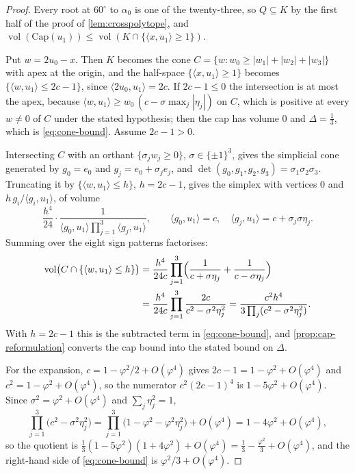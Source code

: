 \documentclass[11pt,reqno]{amsart}
\renewcommand{\_}{\origunderscore\allowbreak}
\numberwithin{equation}{section}
\theoremstyle{plain}
\theoremstyle{definition}
\theoremstyle{remark}
\newcommand{\tilt}{\varphi}                  %
\newcommand{\dev}{\eta}                      %
\newcommand{\defect}{\Delta}                 %
\newcommand{\base}{u}                        %
\newcommand{\capQ}{\mathrm{Cap}}             %
\DeclareMathOperator{\vol}{vol}
\begin{document}
\begin{proof}
Every root at $60^\circ$ to $\alpha_0$ is one of the twenty-three, so
$Q\subseteq K$ by the first half of the proof of
\cref{lem:crosspolytope}, and $\vol(\capQ(\base_1))\le\vol(K\cap\{\langle
x,\base_1\rangle\ge1\})$.

Put $w=2\base_0-x$. Then $K$ becomes the cone
$C=\{w:w_0\ge|w_1|+|w_2|+|w_3|\}$ with apex at the origin, and the
half-space $\{\langle x,\base_1\rangle\ge1\}$ becomes $\{\langle
w,\base_1\rangle\le2c-1\}$, since $\langle
2\base_0,\base_1\rangle=2c$. If $2c-1\le0$ the intersection is at most
the apex, because $\langle w,\base_1\rangle\ge w_0\,(c-\sigma\max_j|\dev_j|)$
on $C$, which is positive at every $w\ne0$ of $C$ under the stated
hypothesis; then the cap has volume $0$ and $\defect=\tfrac13$, which is
\eqref{eq:cone-bound}. Assume $2c-1>0$.

Intersecting $C$ with an orthant $\{\sigma_jw_j\ge0\}$, $\sigma\in\{\pm
1\}^3$, gives the simplicial cone generated by $g_0=e_0$ and
$g_j=e_0+\sigma_je_j$, and $\det(g_0,g_1,g_2,g_3)=\sigma_1\sigma_2\sigma_3$.
Truncating it by $\{\langle w,\base_1\rangle\le h\}$, $h=2c-1$, gives the
simplex with vertices $0$ and $h\,g_i/\langle g_i,\base_1\rangle$, of
volume
\[
  \frac{h^4}{24}\cdot\frac{1}{\langle g_0,\base_1\rangle
  \prod_{j=1}^{3}\langle g_j,\base_1\rangle},
  \qquad
  \langle g_0,\base_1\rangle=c,\quad
  \langle g_j,\base_1\rangle=c+\sigma_j\sigma\dev_j .
\]
Summing over the eight sign patterns factorises:
\[
\begin{aligned}
  \vol\bigl(C\cap\{\langle w,\base_1\rangle\le h\}\bigr)
  &=\frac{h^4}{24c}\prod_{j=1}^{3}
   \Bigl(\frac{1}{c+\sigma\dev_j}+\frac{1}{c-\sigma\dev_j}\Bigr)\\
  &=\frac{h^4}{24c}\prod_{j=1}^{3}\frac{2c}{c^2-\sigma^2\dev_j^2}
  =\frac{c^2h^4}{3\prod_j(c^2-\sigma^2\dev_j^2)} .
\end{aligned}
\]
With $h=2c-1$ this is the subtracted term in \eqref{eq:cone-bound}, and
\cref{prop:cap-reformulation} converts the cap bound into the stated
bound on $\defect$.

For the expansion, $c=1-\tilt^2/2+O(\tilt^4)$ gives $2c-1=1-\tilt^2+O(\tilt^4)$
and $c^2=1-\tilt^2+O(\tilt^4)$, so the numerator $c^2(2c-1)^4$ is
$1-5\tilt^2+O(\tilt^4)$. Since $\sigma^2=\tilt^2+O(\tilt^4)$ and
$\sum_j\dev_j^2=1$,
\[
  \prod_{j=1}^{3}\bigl(c^2-\sigma^2\dev_j^2\bigr)
  =\prod_{j=1}^{3}\bigl(1-\tilt^2-\tilt^2\dev_j^2\bigr)+O(\tilt^4)
  =1-4\tilt^2+O(\tilt^4),
\]
so the quotient is
$\tfrac13(1-5\tilt^2)(1+4\tilt^2)+O(\tilt^4)=\tfrac13-\tfrac{\tilt^2}{3}+O(\tilt^4)$,
and the right-hand side of \eqref{eq:cone-bound} is
$\tilt^2/3+O(\tilt^4)$.


\end{proof}
\end{document}
